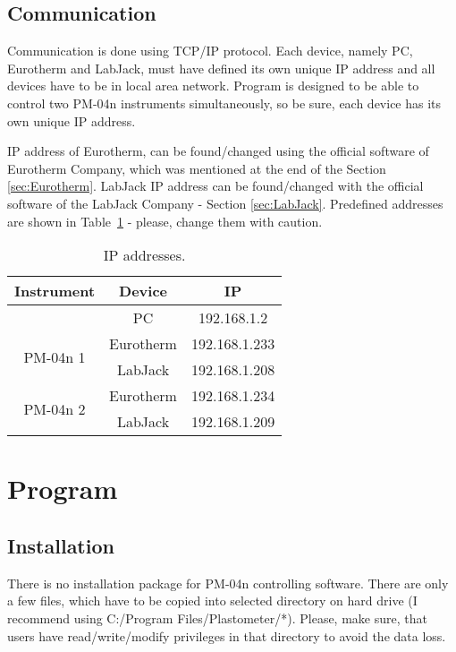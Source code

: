 \documentclass[a4paper,11pt,oneside]{report}
\theoremstyle{named}
\begin{document}
\section{Communication}
\label{sec:Communication}

Communication is done using TCP/IP protocol. Each device, namely PC,
Eurotherm and LabJack, must have defined its own unique IP address and all
devices have to be in local area network. Program is designed to be able to
control two PM-04n instruments simultaneously, so be sure, each device has its
own unique IP address. 

IP address of Eurotherm, can be found/changed using the official software of
Eurotherm Company, which was mentioned at the end of the Section
\ref{sec:Eurotherm}. LabJack IP address can be found/changed with the official
software of the LabJack Company - Section \ref{sec:LabJack}. Predefined
addresses are shown in Table~\ref{tab:IPAddresses} - please, change them with
caution. 

\begin{table}
  \centering
  \begin{tabular}{|c|c|c|}
    \hline
    Instrument  & Device & IP  \\
    \hline \hline
                              & PC & 192.168.1.2 \\
    \hline
    \multirow{2}{*}{PM-04n 1} & Eurotherm & 192.168.1.233 \\
                              & LabJack   & 192.168.1.208 \\
    \hline
    \multirow{2}{*}{PM-04n 2} & Eurotherm & 192.168.1.234 \\
                              & LabJack   & 192.168.1.209 \\
    \hline
  \end{tabular}
  \caption{IP addresses.}
  \label{tab:IPAddresses}
\end{table}








\chapter{Program}
\label{ch:Program}

\section{Installation}

There is no installation package for PM-04n controlling software. There are only
a few files, which have to be copied into selected directory on hard drive (I
recommend using C:/Program Files/Plastometer/*). Please, make sure, that users
have read/write/modify privileges in that directory to avoid the data loss.
\end{document}
